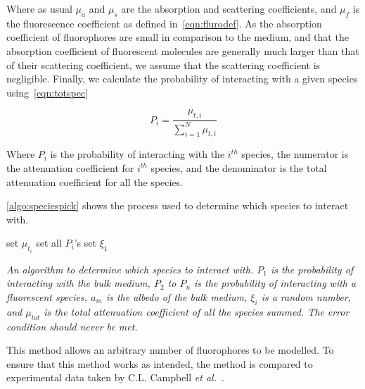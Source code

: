 Where as usual $\mu_a$ and $\mu_s$ are the absorption and scattering coefficients, and $\mu_f$ is the fluorescence coefficient as defined in~\cref{eqn:flurodef}.
As the absorption coefficient of fluorophores are small in comparison to the medium, and that the absorption coefficient of fluorescent molecules are generally much larger than that of their scattering coefficient, we assume that the scattering coefficient is negligible.
Finally, we calculate the probability of interacting with a given species using~\cref{eqn:totspec}

\begin{equation}
P_i=\frac{\mu_{t,i}}{\sum\limits_{i=1}^{N} \mu_{t,i}}
\label{eqn:totspec}
\end{equation}

Where $P_i$ is the probability of interacting with the $i^{th}$ species, the numerator is the attenuation coefficient for $i^{th}$ species, and the denominator is the total attenuation coefficient for all the species.

\cref{algo:speciespick} shows the process used to determine which species to interact with.

\begin{center}
\begin{algorithm}[H]
\SetAlgoLined
  set $\mu_{t_{i}}$\;
  set all $P_i$'s\;
  set $\xi_1$\;
\
\caption{\textit{An algorithm to determine which species to interact with. $P_1$ is the probability of interacting with the bulk medium, $P_2$ to $P_n$ is the probability of interacting with a fluorescent species, $a_m$ is the albedo of the bulk medium, $\xi_i$ is a random number, and $\mu_{tot}$ is the total attenuation coefficient of all the species summed. The error condition should never be met.}}
\label{algo:speciespick}
\end{algorithm}
\end{center}

This method allows an arbitrary number of fluorophores to be modelled.
To ensure that this method works as intended, the method is compared to experimental data taken by C.L. Campbell \textit{et al.}~\cite{louisethesis}.

